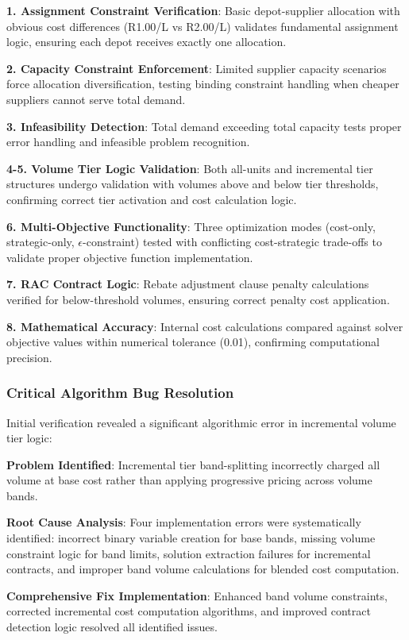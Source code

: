 \textbf{1. Assignment Constraint Verification}: Basic depot-supplier allocation with obvious cost differences (R1.00/L vs R2.00/L) validates fundamental assignment logic, ensuring each depot receives exactly one allocation.

\textbf{2. Capacity Constraint Enforcement}: Limited supplier capacity scenarios force allocation diversification, testing binding constraint handling when cheaper suppliers cannot serve total demand.

\textbf{3. Infeasibility Detection}: Total demand exceeding total capacity tests proper error handling and infeasible problem recognition.

\textbf{4-5. Volume Tier Logic Validation}: Both all-units and incremental tier structures undergo validation with volumes above and below tier thresholds, confirming correct tier activation and cost calculation logic.

\textbf{6. Multi-Objective Functionality}: Three optimization modes (cost-only, strategic-only, $\epsilon$-constraint) tested with conflicting cost-strategic trade-offs to validate proper objective function implementation.

\textbf{7. RAC Contract Logic}: Rebate adjustment clause penalty calculations verified for below-threshold volumes, ensuring correct penalty cost application.

\textbf{8. Mathematical Accuracy}: Internal cost calculations compared against solver objective values within numerical tolerance (0.01), confirming computational precision.

\subsubsection{Critical Algorithm Bug Resolution}

Initial verification revealed a significant algorithmic error in incremental volume tier logic:

\textbf{Problem Identified}: Incremental tier band-splitting incorrectly charged all volume at base cost rather than applying progressive pricing across volume bands.

\textbf{Root Cause Analysis}: Four implementation errors were systematically identified: incorrect binary variable creation for base bands, missing volume constraint logic for band limits, solution extraction failures for incremental contracts, and improper band volume calculations for blended cost computation.

\textbf{Comprehensive Fix Implementation}: Enhanced band volume constraints, corrected incremental cost computation algorithms, and improved contract detection logic resolved all identified issues.

